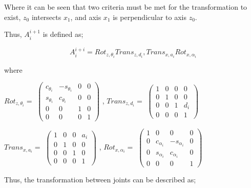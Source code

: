 \documentclass[12pt,openany,a4paper]{book}
\begin{document}
Where it can be seen that two criteria must be met for the transformation to exist, $z_0$ intersects $x_1$, and axis $x_1$ is perpendicular to axis $z_0$.

\vspace{\baselineskip}
Thus, $A_{i}^{i+1}$ is defined as;

\vspace{\baselineskip}
\begin{equation}
A_{i}^{i+i} = Rot_{z,\theta_i} Trans_{z, d_i}, Trans_{x, a_i} Rot_{x, \alpha_i}
\end{equation}

\vspace{\baselineskip}

where

\vspace{\baselineskip}
$Rot_{z,\theta_i} =$
$
 \left(\begin{array}{cccc} c_{\theta_i} & -s_{\theta_i} & 0 & 0\\ s_{\theta_i} & c_{\theta_i} & 0 & 0\\ 0 & 0 & 1 & 0\\ 0 & 0 & 0 & 1 \end{array}\right)
$
, 
$Trans_{z, d_i} =$
$
 \left(\begin{array}{cccc} 1 & 0 & 0 & 0\\ 0 & 1 & 0 & 0\\ 0 & 0 & 1 & d_i\\ 0 & 0 & 0 & 1 \end{array}\right)
$

\vspace{\baselineskip}

$Trans_{x, a_i} =$
$
 \left(\begin{array}{cccc} 1 & 0 & 0 & a_i\\ 0 & 1 & 0 & 0\\ 0 & 0 & 1 & 0\\ 0 & 0 & 0 & 1 \end{array}\right)
$
, 
$Rot_{x, \alpha_i} =$
$
 \left(\begin{array}{cccc} 1 & 0 & 0 & 0\\ 0 & c_{\alpha_i} & -s_{\alpha_i} & 0\\ 0 & s_{\alpha_i} & c_{\alpha_i} & 0\\ 0 & 0 & 0 & 1 \end{array}\right)
$
\vspace{\baselineskip}

Thus, the transformation between joints can be described as;
\end{document}

